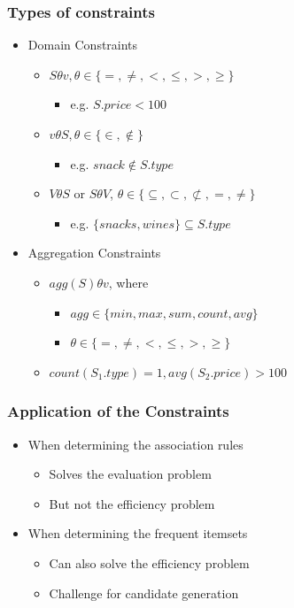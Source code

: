 \documentclass{article}
\begin{document}
\subsubsection{Types of constraints}
\begin{itemize}
  \item Domain Constraints
    \begin{itemize}
      \item $S \theta v, \theta \in \{=, \ne, <, \le, >, \ge\}$
      \begin{itemize}
        \item e.g. $S.price < 100$
      \end{itemize}

      \item $v \theta S, \theta \in \{\in, \notin\}$
      \begin{itemize}
        \item e.g. $snack \notin S.type$
      \end{itemize}

      \item $V \theta S$ or $S \theta V$, $\theta \in \{\subseteq, \subset, \not\subset, =, \ne\}$
      \begin{itemize}
        \item e.g. $\{snacks, wines\} \subseteq S.type$
      \end{itemize}
    \end{itemize}
  
  \item Aggregation Constraints
    \begin{itemize}
      \item $agg(S) \theta v$, where
      \begin{itemize}
        \item $agg \in \{min, max, sum, count, avg\}$
        \item $\theta \in \{=, \ne, <, \le, >, \ge\}$
      \end{itemize}
      \item $count(S_1.type) = 1, avg(S_2.price) > 100$
    \end{itemize}
\end{itemize}

\subsubsection{Application of the Constraints}
\begin{itemize}
  \item When determining the association rules
    \begin{itemize}
      \item Solves the evaluation problem
      \item But not the efficiency problem
    \end{itemize}
  \item When determining the frequent itemsets
    \begin{itemize}
      \item Can also solve the efficiency problem
      \item Challenge for candidate generation
    \end{itemize}
\end{itemize} 
\end{document}
